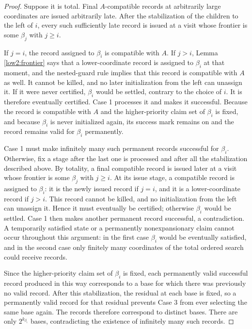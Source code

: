 \documentclass[10pt,a4paper]{amsart}
\begin{document}
\begin{proof}
Suppose it is total. Final $A$-compatible records at arbitrarily large
coordinates are issued arbitrarily late. After the stabilization of the
children to the left of $i$, every such sufficiently late record is issued at
a visit whose frontier is some $\beta_j$ with $j\geq i$.

If $j=i$, the record assigned to $\beta_i$ is compatible with $A$. If $j>i$,
Lemma \ref{low2:frontier} says that a lower-coordinate record is assigned to
$\beta_i$ at that moment, and the nested-guard rule implies that this record
is compatible with $A$ as well. It cannot be killed, and no later
initialization from the left can unassign it. If it were never certified,
$\beta_i$ would be settled, contrary to the choice of $i$. It is therefore
eventually certified. Case 1 processes it and makes it successful.
Because the record is compatible with $A$ and the higher-priority claim set
of $\beta_i$ is fixed, and because $\beta_i$ is never initialized again, its
success mark remains on and the record remains valid for $\beta_i$
permanently.

Case 1 must make infinitely many such permanent records successful for
$\beta_i$. Otherwise, fix a stage after the last one is processed and after
all the stabilization described above. By totality, a final compatible record
is issued later at a visit whose frontier is some $\beta_j$ with $j\geq i$.
At its issue stage, a compatible record is assigned to $\beta_i$: it is the
newly issued record if $j=i$, and it is a lower-coordinate record if $j>i$.
This record cannot be killed, and no initialization from the left can unassign
it. Hence it must eventually be certified; otherwise $\beta_i$ would be
settled. Case 1 then makes another permanent record successful, a
contradiction. A temporarily satisfied state or a permanently
nonexpansionary claim cannot occur throughout this argument: in the first
case $\beta_i$ would be eventually satisfied, and in the second case only
finitely many coordinates of the total ordered search could receive records.

Since the higher-priority claim set of $\beta_i$ is fixed, each permanently
valid successful record produced in this way corresponds to a base for which
there was previously no valid record. After this stabilization, the residual
at each base is fixed, so a permanently valid record for that residual
prevents Case 3 from ever selecting the same base again. The records therefore
correspond to distinct bases. There are only $2^{k_{\beta_i}}$ bases,
contradicting the existence of infinitely many such records.
\end{proof}
\end{document}
